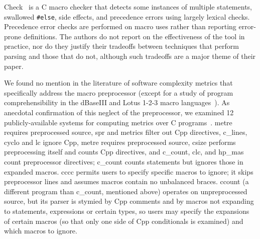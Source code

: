 \documentclass[10pt]{article}
\newcommand{\pkg}[1]{\textsf{#1}}
\begin{document}
Check~\cite{SpulerS92} is a C macro checker that detects some instances of multiple
statements, swallowed {\tt \#else}, side effects, and precedence errors
using largely lexical checks.  Precedence error checks are
performed on macro uses rather than reporting error-prone definitions.  The
authors do not report on the effectiveness of the tool in practice, nor do they
justify their tradeoffs between techniques that perform parsing and those
that do not, although such tradeoffs are a major theme of their paper.


We found no mention in the literature of software complexity metrics that
specifically address the macro preprocessor (except for a study of program
comprehensibility in the dBaseIII and Lotus 1-2-3 macro
languages~\cite{DavisDL90}).  As anecdotal confirmation of this neglect of
the preprocessor, we examined 12 publicly-available systems for computing
metrics over C programs~\cite{Lott-metrics-tools}.
\pkg{metre} requires preprocessed source, \pkg{spr} and \pkg{metrics}
filter out Cpp directives, \pkg{c\_lines}, \pkg{cyclo} and \pkg{lc} ignore
Cpp, \pkg{metre} requires preprocessed source, \pkg{csize} performs
preprocessing itself and counts Cpp directives, and \pkg{c\_count},
\pkg{clc}, and \pkg{hp\_mas} count preprocessor directives;
\pkg{c\_count} counts statements but ignores those in expanded macros.
\pkg{cccc} permits users to specify specific macros to ignore; it skips
preprocessor lines and assumes macros contain no unbalanced braces.
\pkg{ccount} (a different program than \pkg{c\_count}, mentioned above) operates on unpreprocessed source, but its parser is stymied
by Cpp comments and by macros not expanding to statements, expressions
or certain types, so users may specify the expansions of certain macros (so
that only one side of Cpp conditionals is examined) and which macros to
ignore.

\end{document}
